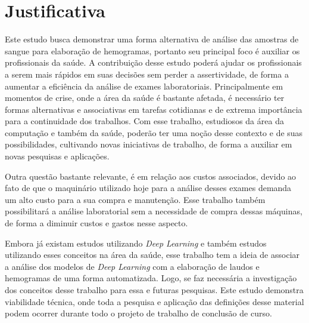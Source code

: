 

\section{Justificativa}
\label{sec:justificativa}
Este estudo busca demonstrar uma forma alternativa de análise das amostras de sangue para elaboração de hemogramas, portanto seu principal foco é auxiliar os profissionais da saúde. A contribuição desse estudo poderá ajudar os profissionais a serem mais rápidos em suas decisões sem perder a assertividade, de forma a aumentar a eficiência da análise de exames laboratoriais. Principalmente em momentos de crise, onde a área da saúde é bastante afetada, é necessário ter formas alternativas e associativas em tarefas cotidianas e de extrema importância para a continuidade dos trabalhos. Com esse trabalho, estudiosos da área da computação e também da saúde, poderão ter uma noção desse contexto e de suas possibilidades, cultivando novas iniciativas de trabalho, de forma a auxiliar em novas pesquisas e aplicações.

Outra questão bastante relevante, é em relação aos custos associados, devido ao fato de que o maquinário utilizado hoje para a análise desses exames demanda um alto custo para a sua compra e manutenção. Esse trabalho também possibilitará a análise laboratorial sem a necessidade de compra dessas máquinas, de forma a diminuir custos e gastos nesse aspecto.

Embora já existam estudos utilizando \emph{Deep Learning} e também estudos utilizando esses conceitos na área da saúde, esse trabalho tem a ideia de associar a análise dos modelos de \emph{Deep Learning} com a elaboração de laudos e hemogramas de uma forma automatizada. Logo, se faz necessária a investigação dos conceitos desse trabalho para essa e futuras pesquisas. Este estudo demonstra viabilidade técnica, onde toda a pesquisa e aplicação das definições desse material podem ocorrer durante todo o projeto de trabalho de conclusão de curso.



